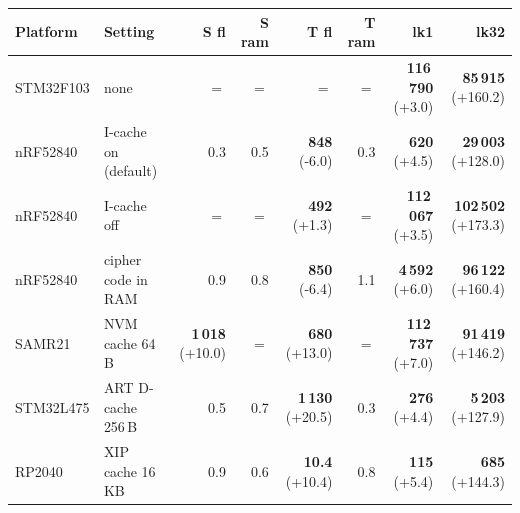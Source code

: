 \begin{tabular}{llrrrrrr}
\hline
Platform & Setting & S fl & S ram & T fl & T ram & lk1 & lk32\\
\hline
STM32F103 & none & $=$ & $=$ & $=$ & $=$ & \textbf{116\,790} {\scriptsize(+3.0)} & \textbf{85\,915} {\scriptsize(+160.2)}\\
nRF52840 & I-cache on (default) & 0.3 & 0.5 & \textbf{848} {\scriptsize(-6.0)} & 0.3 & \textbf{620} {\scriptsize(+4.5)} & \textbf{29\,003} {\scriptsize(+128.0)}\\
nRF52840 & I-cache off & $=$ & $=$ & \textbf{492} {\scriptsize(+1.3)} & $=$ & \textbf{112\,067} {\scriptsize(+3.5)} & \textbf{102\,502} {\scriptsize(+173.3)}\\
nRF52840 & cipher code in RAM & 0.9 & 0.8 & \textbf{850} {\scriptsize(-6.4)} & 1.1 & \textbf{4\,592} {\scriptsize(+6.0)} & \textbf{96\,122} {\scriptsize(+160.4)}\\
SAMR21 & NVM cache 64\,B & \textbf{1\,018} {\scriptsize(+10.0)} & $=$ & \textbf{680} {\scriptsize(+13.0)} & $=$ & \textbf{112\,737} {\scriptsize(+7.0)} & \textbf{91\,419} {\scriptsize(+146.2)}\\
STM32L475 & ART D-cache 256\,B & 0.5 & 0.7 & \textbf{1\,130} {\scriptsize(+20.5)} & 0.3 & \textbf{276} {\scriptsize(+4.4)} & \textbf{5\,203} {\scriptsize(+127.9)}\\
RP2040 & XIP cache 16\,KB & 0.9 & 0.6 & \textbf{10.4} {\scriptsize(+10.4)} & 0.8 & \textbf{115} {\scriptsize(+5.4)} & \textbf{685} {\scriptsize(+144.3)}\\
\hline
\end{tabular}
